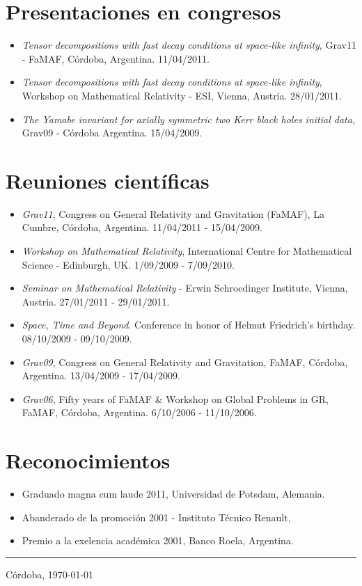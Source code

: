 \documentclass[a4paper]{article}
\begin{document}
\section{Presentaciones en congresos}
\begin{itemize}
 \item \emph{Tensor decompositions with fast decay conditions at space-like
infinity}, Grav11 - FaMAF, Córdoba, Argentina. 11/04/2011.
 \item \emph{Tensor decompositions with fast decay conditions at space-like
infinity}, Workshop on Mathematical Relativity - ESI, Vienna, Austria.
28/01/2011.
 \item \emph{The Yamabe invariant for axially symmetric two Kerr black
holes initial data}, Grav09 - Córdoba Argentina. 15/04/2009.
\end{itemize}

\section{Reuniones cient\'ificas}
\begin{itemize}
 \item \emph{Grav11}, Congress on General Relativity and Gravitation (FaMAF),
La Cumbre, Córdoba, Argentina. 11/04/2011 - 15/04/2009. 
 \item \emph{Workshop on Mathematical Relativity}, International Centre for
Mathematical Science - Edinburgh, UK. 1/09/2009 - 7/09/2010.
 \item \emph{Seminar on Mathematical Relativity} - Erwin Schroedinger
Institute, Vienna, Austria. 27/01/2011 - 29/01/2011.
 \item \emph{Space, Time and Beyond}. Conference in honor of Helmut
Friedrich's birthday.
08/10/2009 - 09/10/2009.
 \item \emph{Grav09}, Congress on General Relativity and Gravitation, FaMAF,
Córdoba, Argentina. 13/04/2009 - 17/04/2009. 
 \item \emph{Grav06}, Fifty years of FaMAF \& Workshop on Global Problems in GR,
FaMAF, Córdoba, Argentina. 6/10/2006 - 11/10/2006. %
\end{itemize}

\section{Reconocimientos}
\begin{itemize}
 \item Graduado magna cum laude 2011, Universidad de Potsdam, Alemania.
 \item Abanderado de la promoci\'on 2001 - Instituto Técnico Renault,
 \item Premio a la exelencia académica 2001, Banco Roela, Argentina.
\end{itemize}

\vspace{2\baselineskip}

\begin{flushright}
\rule{7cm}{0.2mm}

 Córdoba,
 \today
\end{flushright}
\end{document}
